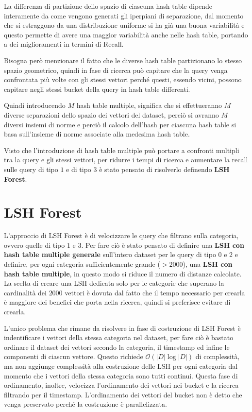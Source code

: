 La differenza di partizione dello spazio di ciascuna hash table dipende interamente 
da come vengono generati gli iperpiani di separazione, dal momento che si estraggono 
da una distribuzione uniforme si ha già una buona variabilità e questo permette di avere 
una maggior variabilità anche nelle hash table, portando a dei miglioramenti in termini di 
Recall.

Bisogna però menzionare il fatto che le diverse hash table partizionano lo stesso 
spazio geometrico, quindi in fase di ricerca può capitare che la query venga confrontata 
più volte con gli stessi vettori perché questi, essendo vicini, possono capitare 
negli stessi bucket della query in hash table differenti.

Quindi introducendo $M$ hash table multiple, significa che si effettueranno $M$ 
diverse separazioni dello spazio dei vettori del dataset, perciò si avranno 
$M$ diversi insiemi di norme e perciò il calcolo dell'hash per ciascuna hash table 
si basa sull'insieme di norme associate alla medesima hash table.

Visto che l'introduzione di hash table multiple può portare a confronti multipli 
tra la query e gli stessi vettori, per ridurre i tempi di ricerca e aumentare 
la recall sulle query di tipo $1$ e di tipo $3$ è stato pensato di risolverlo 
definendo \textbf{LSH Forest}.

\section{LSH Forest}
L'approccio di LSH Forest è di velocizzare le query che filtrano sulla categoria,
ovvero quelle di tipo $1$ e $3$. Per fare ciò è stato pensato di definire una \textbf{LSH
con hash table multiple generale} sull'intero dataset per le query di tipo $0$ e $2$ e definire,
per ogni categoria sufficientemente grande ($>2000$), una \textbf{LSH con hash table multiple}, in questo 
modo si riduce il numero di distanze calcolate. La scelta di creare 
una LSH dedicata solo per le categorie che superano la cardinalità dei $2000$ vettori 
è dovuta dal fatto che il tempo necessario per crearla è maggiore dei benefici 
che porta nella ricerca, quindi si preferisce evitare di crearla.

L'unico problema che rimane da risolvere in fase di costruzione di LSH Forest è 
indentificare i vettori della stessa categoria nel dataset, per fare ciò è bastato 
ordinare il dataset dei vettori secondo la categoria, il timestamp ed infine 
le componenti di ciascun vettore. Questo richiede $\mathcal{O}(|D|\log |D|)$ di 
complessità, ma non aggiunge complessità alla costruzione delle LSH per ogni categoria 
dal momento che i vettori della stessa categoria sono tutti continui. Questa 
fase di ordinamento, inoltre, velocizza l'ordinamento dei vettori nei bucket e la ricerca 
filtrando per il timestamp. L'ordinamento dei vettori del bucket non è detto 
che venga preservato perché la costruzione è parallelizzata.

